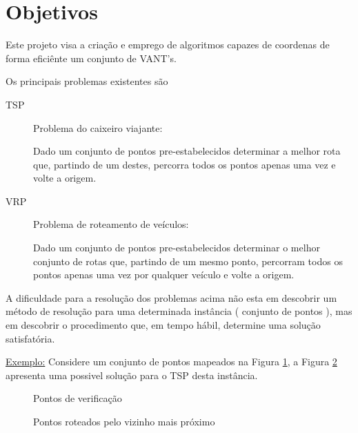 \documentclass[a4paper, 12pt]{article}
\begin{document}

\newpage


\section{Objetivos}

	Este projeto visa a criação e emprego de algoritmos capazes de coordenas de
forma eficiênte um conjunto de VANT's.

	Os principais problemas existentes são
\begin{description}
	\item[TSP] Problema do caixeiro viajante:

	Dado um conjunto de pontos pre-estabelecidos determinar a melhor rota que,
partindo de um destes, percorra todos os pontos apenas uma vez e volte a origem.

	\item[VRP] Problema de roteamento de veículos:

	Dado um conjunto de pontos pre-estabelecidos determinar o melhor conjunto de
rotas que, partindo de um mesmo ponto, percorram todos os pontos apenas uma vez
por qualquer veículo e volte a origem.
\end{description}

	A dificuldade para a resolução dos problemas acima não esta em descobrir um
método de resolução para uma determinada instância ( conjunto de pontos ), mas
em descobrir o procedimento que, em tempo hábil, determine uma solução
satisfatória.

\underline{Exemplo:}
	Considere um conjunto de pontos mapeados na Figura \ref{test}, a Figura
\ref{roteado} apresenta uma possivel solução para o TSP desta instância.


\begin{figure}[!ht]
\centering
{}
\caption{Pontos de verificação}
\label{test}
\end{figure}
\begin{figure}[!ht]
\centering
{}
\caption{Pontos roteados pelo vizinho mais próximo}
\label{roteado}
\end{figure}
\end{document}
